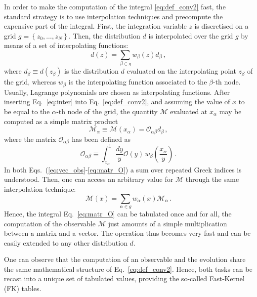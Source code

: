 In order to make the computation of the integral \eqref{eq:def_conv2} fast, the standard strategy is to use interpolation techniques and precompute the expensive part of the integral. First, the integration variable $z$ is discretised on a grid $g=\left\{ z_0,\dots, z_N\right\}$. Then, the distribution $d$ is interpolated over the grid $g$ by means of a set of interpolating functions:
\begin{equation}
  d(z) = \sum_{\beta \in g} w_{\beta}(z) d_{\beta} \,,
  \label{eq:inter}
\end{equation}
where $d_{\beta} \equiv d(z_{\beta})$ is the distribution $d$ evaluated on the interpolating point $z_{\beta}$ of the grid, whereas $w_{\beta}$ is the interpolating function associated to the $\beta$-th node. Usually, Lagrange polynomials are chosen as interpolating functions. After inserting Eq.~\eqref{eq:inter} into Eq.~\eqref{eq:def_conv2}, and assuming the value of $x$ to be equal to the $\alpha$-th node of the grid, the quantity $\mathcal{M}$ evaluated at $x_{\alpha}$ may be computed as a simple matrix product
\begin{equation}
  \mathcal{M}_{\alpha} \equiv \mathcal{M}(x_{\alpha}) = \mathcal{O}_{\alpha \beta} d_{\beta} \,,
  \label{eq:vec_obs}
\end{equation}
where the matrix $\mathcal{O}_{\alpha \beta}$ has been defined as
\begin{equation}
  \mathcal{O}_{\alpha \beta} \equiv \int_{x_{\alpha}}^{1} \frac{dy}{y} \mathcal{O}(y) \, w_{\beta} \left( \frac{x_{\alpha}}{y}  \right) \,.
  \label{eq:matr_O}
\end{equation}
In both Eqs.~(\ref{eq:vec_obs}-\ref{eq:matr_O}) a sum over repeated Greek indices is understood. Then, one can access an arbitrary value for $\mathcal{M}$ through the same interpolation technique:
\begin{equation}
  \mathcal{M}(x) = \sum_{\alpha \in g} w_{\alpha}(x) \mathcal{M}_{\alpha} \,.
\end{equation}
Hence, the integral Eq.~\eqref{eq:matr_O} can be tabulated once and for all, the computation of the observable $\mathcal{M}$ just amounts of a simple multiplication between a matrix and a vector. The operation thus becomes very fast and can be easily extended to any other distribution $d$.%

One can observe that the computation of an observable and the evolution share the same mathematical structure of Eq.~\eqref{eq:def_conv2}. Hence, both tasks can be recast into a unique set of tabulated values, providing the so-called Fast-Kernel (FK) tables.

